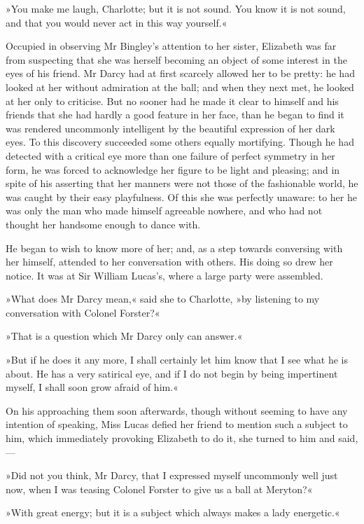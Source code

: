 »You make me laugh, Charlotte; but it is not sound. You know it is not sound, and that you would never act in this way yourself.«

Occupied in observing Mr Bingley's attention to her sister, Elizabeth was far from suspecting that she was herself becoming an object of some interest in the eyes of his friend. Mr Darcy had at first scarcely allowed her to be pretty: he had looked at her without admiration at the ball; and when they next met, he looked at her only to criticise. But no sooner had he made it clear to himself and his friends that she had hardly a good feature in her face, than he began to find it was rendered uncommonly intelligent by the beautiful expression of her dark eyes. To this discovery succeeded some others equally mortifying. Though he had detected with a critical eye more than one failure of perfect symmetry in her form, he was forced to acknowledge her figure to be light and pleasing; and in spite of his asserting that her manners were not those of the fashionable world, he was caught by their easy playfulness. Of this she was perfectly unaware: to her he was only the man who made himself agreeable nowhere, and who had not thought her handsome enough to dance with.

He began to wish to know more of her; and, as a step towards conversing with her himself, attended to her conversation with others. His doing so drew her notice. It was at Sir William Lucas's, where a large party were assembled.

»What does Mr Darcy mean,« said she to Charlotte, »by listening to my conversation with Colonel Forster?«

»That is a question which Mr Darcy only can answer.«

»But if he does it any more, I shall certainly let him know that I see what he is about. He has a very satirical eye, and if I do not begin by being impertinent myself, I shall soon grow afraid of him.«


On his approaching them soon afterwards, though without seeming to have any intention of speaking, Miss Lucas defied her friend to mention such a subject to him, which immediately provoking Elizabeth to do it, she turned to him and said,—

»Did not you think, Mr Darcy, that I expressed myself uncommonly well just now, when I was teasing Colonel Forster to give us a ball at Meryton?«

»With great energy; but it is a subject which always makes a lady energetic.«

